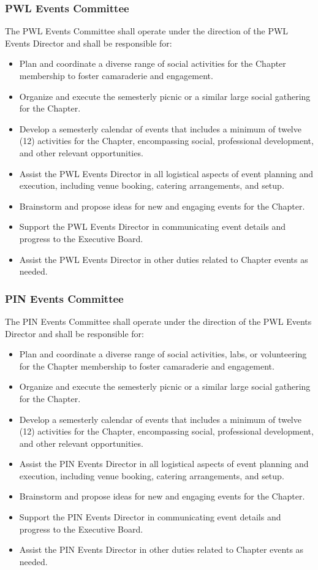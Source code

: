 \documentclass[10pt, oneside]{article}
\begin{document}
\subsubsection{PWL Events Committee}
The PWL Events Committee shall operate under the direction of the PWL Events Director and shall be responsible for:
\begin{itemize}
    \item Plan and coordinate a diverse range of social activities for the Chapter membership to foster camaraderie and engagement.
    \item Organize and execute the semesterly picnic or a similar large social gathering for the Chapter.
    \item Develop a semesterly calendar of events that includes a minimum of twelve (12) activities for the Chapter, encompassing social, professional development, and other relevant opportunities.
    \item Assist the PWL Events Director in all logistical aspects of event planning and execution, including venue booking, catering arrangements, and setup.
    \item Brainstorm and propose ideas for new and engaging events for the Chapter.
    \item Support the PWL Events Director in communicating event details and progress to the Executive Board.
    \item Assist the PWL Events Director in other duties related to Chapter events as needed.
\end{itemize}

\subsubsection{PIN Events Committee}
The PIN Events Committee shall operate under the direction of the PWL Events Director and shall be responsible for:
\begin{itemize}
    \item Plan and coordinate a diverse range of social activities, labs, or volunteering for the Chapter membership to foster camaraderie and engagement.
    \item Organize and execute the semesterly picnic or a similar large social gathering for the Chapter.
    \item Develop a semesterly calendar of events that includes a minimum of twelve (12) activities for the Chapter, encompassing social, professional development, and other relevant opportunities.
    \item Assist the PIN Events Director in all logistical aspects of event planning and execution, including venue booking, catering arrangements, and setup.
    \item Brainstorm and propose ideas for new and engaging events for the Chapter.
    \item Support the PIN Events Director in communicating event details and progress to the Executive Board.
    \item Assist the PIN Events Director in other duties related to Chapter events as needed.
\end{itemize}
\end{document}
